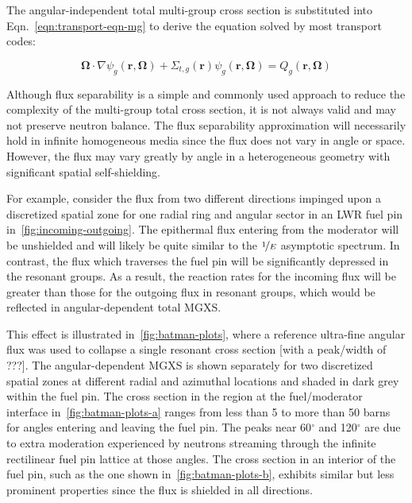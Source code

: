 \noindent The angular-independent total multi-group cross section is substituted into Eqn.~\ref{eqn:transport-eqn-mg} to derive the equation solved by most transport codes:

\begin{dmath}
\label{eqn:transport-eqn-mg-separate}
\mathbf{\Omega} \cdot \nabla \psi_{g}(\mathbf{r},\mathbf{\Omega}) + \Sigma_{t,g}(\mathbf{r})\psi_{g}(\mathbf{r},\mathbf{\Omega}) = Q_{g}(\mathbf{r},\mathbf{\Omega})
\end{dmath}

Although flux separability is a simple and commonly used approach to reduce the complexity of the multi-group total cross section, it is not always valid and may not preserve neutron balance. The flux separability approximation will necessarily hold in infinite homogeneous media since the flux does not vary in angle or space. However, the flux may vary greatly by angle in a heterogeneous geometry with significant spatial self-shielding.

For example, consider the flux from two different directions impinged upon a discretized spatial zone for one radial ring and angular sector in an LWR fuel pin in~\autoref{fig:incoming-outgoing}. The epithermal flux entering from the moderator will be unshielded and will likely be quite similar to the $\nicefrac{1}{E}$ asymptotic spectrum. In contrast, the flux which traverses the fuel pin will be significantly depressed in the resonant groups. As a result, the reaction rates for the incoming flux will be greater than those for the outgoing flux in resonant groups, which would be reflected in angular-dependent total MGXS.

This effect is illustrated in~\autoref{fig:batman-plots}, where a reference ultra-fine angular flux was used to collapse a single resonant cross section {\color{red}[with a peak/width of ???]}. The angular-dependent MGXS is shown separately for two discretized spatial zones at different radial and azimuthal locations and shaded in dark grey within the fuel pin. The cross section in the region at the fuel/moderator interface in~\autoref{fig:batman-plots-a} ranges from less than 5 to more than 50 barns for angles entering and leaving the fuel pin. The peaks near 60$^{\circ}$ and 120$^{\circ}$ are due to extra moderation experienced by neutrons streaming through the infinite rectilinear fuel pin lattice at those angles. The cross section in an interior of the fuel pin, such as the one shown in~\autoref{fig:batman-plots-b}, exhibits similar but less prominent properties since the flux is shielded in all directions.

